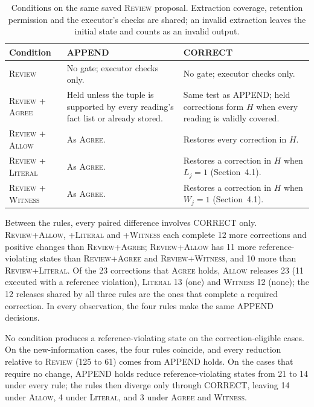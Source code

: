 \documentclass[acmsmall,review]{acmart}
\newcommand{\agree}{\textsc{Agree}}
\newcommand{\allow}{\textsc{Allow}}
\newcommand{\literal}{\textsc{Literal}}
\newcommand{\witness}{\textsc{Witness}}
\newcommand{\review}{\textsc{Review}}
\begin{document}
\begin{table}[H]
\centering
\caption{Conditions on the same saved \review{} proposal. Extraction coverage, retention permission and the executor's checks are shared; an invalid extraction leaves the initial state and counts as an invalid output.}\label{tab:L1}
\small
\setlength{\tabcolsep}{3pt}
\begin{tabular}{@{}>{\raggedright\arraybackslash}p{}>{\raggedright\arraybackslash}p{}>{\raggedright\arraybackslash}p{}@{}}
\toprule
\textbf{Condition} & \textbf{APPEND} & \textbf{CORRECT} \\
\midrule
\review{} & No gate; executor checks only. & No gate; executor checks only. \\
\review{} + \agree{} & Held unless the tuple is supported by every reading's fact list or already stored. & Same test as APPEND; held corrections form $H$ when every reading is validly covered. \\
\review{} + \allow{} & As \agree{}. & Restores every correction in $H$. \\
\review{} + \literal{} & As \agree{}. & Restores a correction in $H$ when $L_j=1$ (Section~4.1). \\
\review{} + \witness{} & As \agree{}. & Restores a correction in $H$ when $W_j=1$ (Section~4.1). \\
\bottomrule
\end{tabular}
\end{table}

Between the rules, every paired difference involves CORRECT only. \review{}+\allow{}, +\literal{} and +\witness{} each complete 12 more corrections and positive changes than \review{}+\agree{}; \review{}+\allow{} has 11 more reference-violating states than \review{}+\agree{} and \review{}+\witness{}, and 10 more than \review{}+\literal{}. Of the 23 corrections that \agree{} holds, \allow{} releases 23 (11 executed with a reference violation), \literal{} 13 (one) and \witness{} 12 (none); the 12 releases shared by all three rules are the ones that complete a required correction. In every observation, the four rules make the same APPEND decisions.

No condition produces a reference-violating state on the correction-eligible cases. On the new-information cases, the four rules coincide, and every reduction relative to \review{} (125 to 61) comes from APPEND holds. On the cases that require no change, APPEND holds reduce reference-violating states from 21 to 14 under every rule; the rules then diverge only through CORRECT, leaving 14 under \allow{}, 4 under \literal{}, and 3 under \agree{} and \witness{}.
\end{document}
